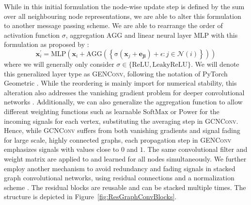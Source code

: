 \documentclass{bioinfo}
\renewcommand{\cite}{\citep}
\begin{document}
While in this initial formulation the node-wise update step is defined
by the sum over all neighbouring node representations, we are able to
alter this formulation to another message passing scheme.  We are able
to rearrange the order of activation function $\sigma$, aggregation
$\mathrm{AGG}$ and linear neural layer $\mathrm{MLP}$ with this
formulation as proposed by \citet{GENConv2020}:
\begin{equation}
	\mathbf{x}_i^{\prime} = \mathrm{MLP} \left( \mathbf{x}_i +
	\mathrm{AGG} \left( \left\{
	\mathrm{\sigma} \left( \mathbf{x}_j + \mathbf{e_{ji}} \right) +\epsilon
	: j \in \mathcal{N}(i) \right\} \right)
	\right)
\end{equation}
where we will generally only consider
$\sigma \in \{\mathrm{ReLU}, \mathrm{LeakyReLU}\}$. We will denote
this generalized layer type as \textsc{GENConv}, following the
notation of PyTorch Geometric \cite{PytorchGeometric}.  While the
reordering is mainly import for numerical stability, this alteration
also addresses the vanishing gradient problem for deeper convolutional
networks \cite{GENConv2020}. Additionally, we can also generalize the
aggregation function to allow different weighting functions such as
learnable $\mathrm{SoftMax}$ or $\mathrm{Power}$ for the incoming
signals for each vertex, substituting the averaging step in
\textsc{GCNConv}. Hence, while \textsc{GCNConv} suffers from both
vanishing gradients and signal fading for large scale, highly
connected graphs, each propagation step in \textsc{GENConv} emphasizes
signals with values close to $0$ and $1$. The same convolutional
filter and weight matrix are applied to and learned for all nodes
simultaneously. %
We further employ another mechanism to avoid redundancy and fading
signals in stacked graph convolutional networks, using residual
connections and a normalization scheme \cite{DeepGCN2019,
  DeeperGCN2020}.
The residual blocks are reusable and can be stacked multiple times. %
The structure is depicted in Figure~\ref{fig:ResGraphConvBlocks}.
\end{document}
